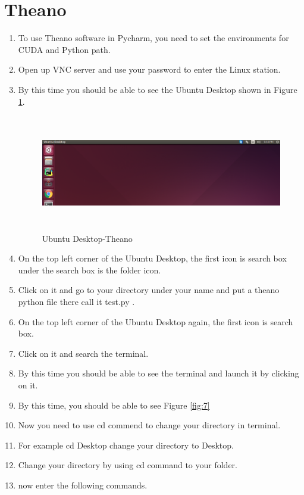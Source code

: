 \documentclass[12pt]{article}
\begin{document}
\section{Theano}
\begin{enumerate}
  \item To use Theano software in Pycharm, you need to set the environments for CUDA and Python path.
  \item Open up VNC server and use your password to enter the Linux station.
  \item By this time you should be able to see the Ubuntu Desktop shown in Figure \ref{fig:1_1}.
\begin{figure}[h]
	\centerline{\includegraphics[width=6in, height=2in]{fig/1.eps}}
	\caption{Ubuntu Desktop-Theano}
	\label{fig:1_1}
\end{figure}
  \item On the top left corner of the Ubuntu Desktop, the first icon is search box under the search box is the folder icon.
  \item Click on it and go to your directory under your name and put a theano python file there call it test.py .
  \item On the top left corner of the Ubuntu Desktop again, the first icon is search box.
  \item Click on it and search the terminal.
  \item By this time you should be able to see the terminal and launch it by clicking on it.
  \item By this time, you should be able to see Figure \ref{fig:7}
  \item Now you need to use cd commend to change your directory in terminal.
  \item For example cd Desktop change your directory to Desktop.
  \item Change your directory by using cd command to your folder.
  \item now enter the following commands.

\end{enumerate}
\end{document}
